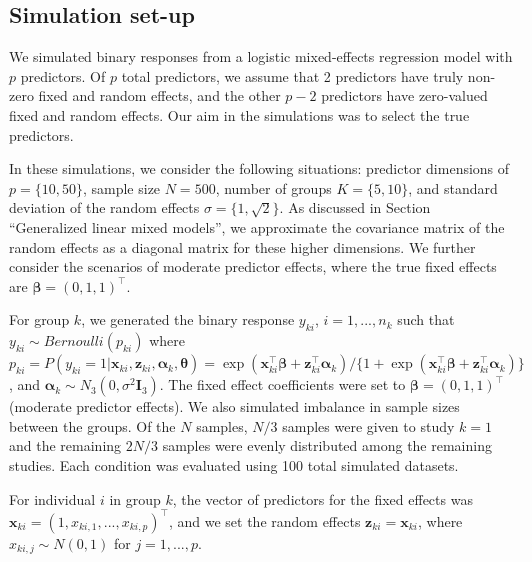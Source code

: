 \subsection{Simulation set-up}
\label{sec:setup}

We simulated binary responses from a logistic mixed-effects regression model with $p$ predictors. Of \(p\) total predictors, we assume that 2 predictors have truly non-zero fixed and random effects, and the other \(p-2\) predictors have zero-valued fixed and random effects. Our aim in the simulations was to select
the true predictors.

In these simulations, we consider the following situations: predictor dimensions of \(p=\{10,50\}\), sample size \(N=500\), number of groups \(K=\{5,10\}\), and standard deviation of the random effects \(\sigma=\{1,\sqrt{2}\}\). As discussed in Section ``Generalized linear mixed models'', we approximate the covariance matrix of the random effects as a diagonal matrix for these higher dimensions. We further consider the scenarios of moderate predictor effects, where the true fixed effects are \(\boldsymbol \beta = (0,1,1)^\top\).

For group \(k\), we generated the binary response \(y_{ki}\), \(i=1,...,n_k\) such that \(y_{ki} \sim Bernoulli(p_{ki})\) where \(p_{ki} = P(y_{ki} = 1 | \boldsymbol x_{ki}, \boldsymbol z_{ki}, \boldsymbol \alpha_k, \boldsymbol \theta) = \exp(\boldsymbol x_{ki}^\top \boldsymbol \beta + \boldsymbol z_{ki}^\top \boldsymbol \alpha_k) / \{1 + \exp(\boldsymbol x_{ki}^\top \boldsymbol \beta + \boldsymbol z_{ki}^\top \boldsymbol \alpha_k) \}\), and \(\boldsymbol \alpha_k \sim N_3(0, \sigma^2 \boldsymbol I_3)\).
The fixed effect coefficients were set to \(\boldsymbol \beta = (0,1,1)^\top\) (moderate predictor effects).
We also simulated imbalance in sample sizes between the groups. Of the \(N\) samples, \(N/3\) samples were given to study \(k=1\) and the remaining \(2N/3\) samples were evenly distributed among
the remaining studies. Each condition was evaluated using 100 total simulated datasets.

For individual \(i\) in group \(k\), the vector of predictors for the fixed effects was \(\boldsymbol x_{ki} = (1,x_{ki,1},...,x_{ki,p})^\top\), and we set the random effects \(\boldsymbol z_{ki} = \boldsymbol x_{ki}\), where \(x_{ki,j} \sim N(0,1)\) for \(j=1,...,p\).

